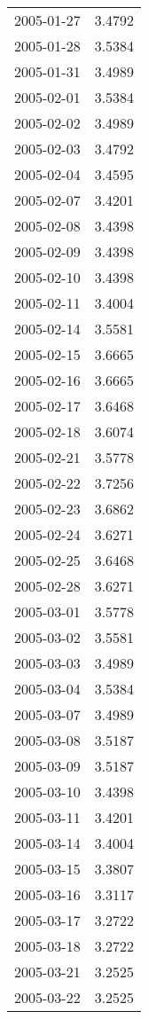 \begin{tabular}{lr}
2005-01-27 &      3.4792 \\
2005-01-28 &      3.5384 \\
2005-01-31 &      3.4989 \\
2005-02-01 &      3.5384 \\
2005-02-02 &      3.4989 \\
2005-02-03 &      3.4792 \\
2005-02-04 &      3.4595 \\
2005-02-07 &      3.4201 \\
2005-02-08 &      3.4398 \\
2005-02-09 &      3.4398 \\
2005-02-10 &      3.4398 \\
2005-02-11 &      3.4004 \\
2005-02-14 &      3.5581 \\
2005-02-15 &      3.6665 \\
2005-02-16 &      3.6665 \\
2005-02-17 &      3.6468 \\
2005-02-18 &      3.6074 \\
2005-02-21 &      3.5778 \\
2005-02-22 &      3.7256 \\
2005-02-23 &      3.6862 \\
2005-02-24 &      3.6271 \\
2005-02-25 &      3.6468 \\
2005-02-28 &      3.6271 \\
2005-03-01 &      3.5778 \\
2005-03-02 &      3.5581 \\
2005-03-03 &      3.4989 \\
2005-03-04 &      3.5384 \\
2005-03-07 &      3.4989 \\
2005-03-08 &      3.5187 \\
2005-03-09 &      3.5187 \\
2005-03-10 &      3.4398 \\
2005-03-11 &      3.4201 \\
2005-03-14 &      3.4004 \\
2005-03-15 &      3.3807 \\
2005-03-16 &      3.3117 \\
2005-03-17 &      3.2722 \\
2005-03-18 &      3.2722 \\
2005-03-21 &      3.2525 \\
2005-03-22 &      3.2525 \\

\end{tabular}
